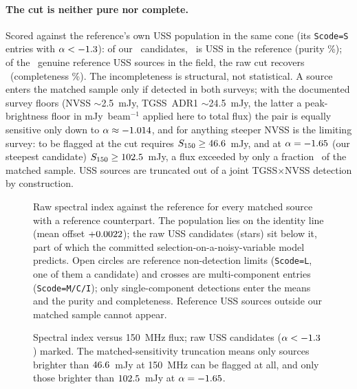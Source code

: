 \documentclass[twocolumn]{aastex631}
\newcommand{\code}[1]{\texttt{#1}}
\begin{document}
\paragraph{The cut is neither pure nor complete.} Scored against the reference's own USS
population in the same cone (its \code{Scode=S} entries with $\alpha<-1.3$): of our
\usNuss\ candidates, \usRealNFlaggedRefUss\ is USS in the reference (purity \usRealPurityPct\%);
of the \usRealNRefUss\ genuine reference USS sources in the field, the raw cut recovers
\usRealNRefUssRec\ (completeness \usRealCompletenessPct\%). The incompleteness is structural, not
statistical. A source enters the matched sample only if detected in both surveys; with the
documented survey floors (NVSS $\sim$2.5~mJy, TGSS~ADR1 $\sim$24.5~mJy, the latter a peak-brightness floor in
mJy~beam$^{-1}$ applied here to total flux) the pair is equally
sensitive only down to $\alpha\approx-1.014$, and for anything steeper NVSS is the limiting
survey: to be flagged at the cut requires $S_{150}\geq46.6$~mJy, and at
$\alpha=-1.65$ (our steepest candidate) $S_{150}\geq102.5$~mJy, a flux
exceeded by only a fraction \usFracAboveSNeeded\ of the matched sample. USS sources are truncated
out of a joint TGSS$\times$NVSS detection by construction.

\begin{figure}
\caption{Raw spectral index against the \citet{degasperin2018} reference for every matched source
with a reference counterpart. The population lies on the identity line (mean offset
$+0.0022$); the raw USS candidates (stars) sit below it, part of which the committed
selection-on-a-noisy-variable model predicts. Open circles are reference non-detection limits
(\code{Scode=L}, one of them a candidate) and crosses are multi-component entries
(\code{Scode=M/C/I}); only single-component detections enter the means and the purity and
completeness. Reference USS sources outside our matched sample cannot appear.}
\label{fig:compare}
\end{figure}

\begin{figure}
\caption{Spectral index versus 150~MHz flux; raw USS candidates ($\alpha<-1.3$) marked.
The matched-sensitivity truncation means only sources brighter than $46.6$~mJy at
150~MHz can be flagged at all, and only those brighter than $102.5$~mJy at
$\alpha=-1.65$.}
\label{fig:scatter}
\end{figure}
\end{document}
